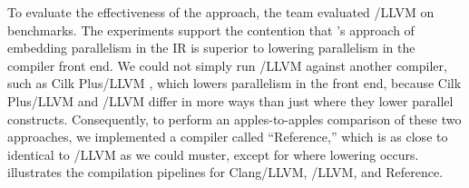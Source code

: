 
To evaluate the effectiveness of the approach, the \tapir team evaluated
\tapir/LLVM on  benchmarks.  The experiments
support the contention that \tapir's approach of embedding parallelism
in the IR is superior to lowering parallelism in the compiler front
end.  We could not simply run \tapir/LLVM against another compiler,
such as Cilk Plus/LLVM \cite{CilkPlusLLVM13}, which lowers parallelism
in the front end, because Cilk Plus/LLVM and \tapir/LLVM differ in
more ways than just where they lower parallel constructs.
Consequently, to perform an apples-to-apples comparison of these two
approaches, we implemented a compiler called ``Reference,'' which is
as close to identical to \tapir/LLVM as we could muster, except for
where lowering occurs.   illustrates the compilation
pipelines for Clang/LLVM, \tapir/LLVM, and Reference.

